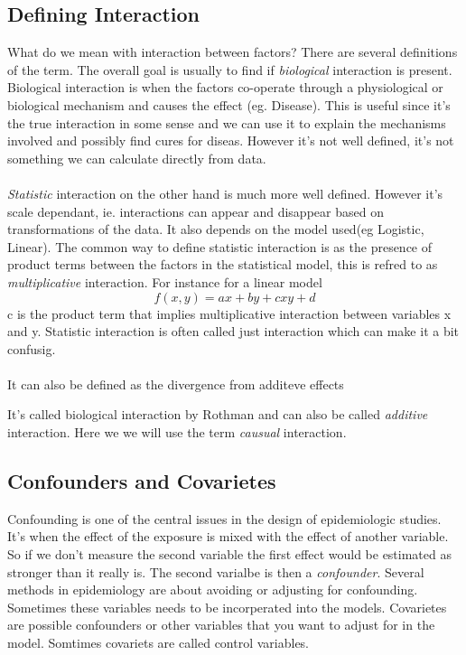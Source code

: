 \documentclass[10pt,a4paper]{article}
\begin{document}
\subsection{Defining Interaction}
What do we mean with interaction between factors? There are several definitions of the term\cite{rothman2002intro_epidemiology}. The overall goal is usually to find if \emph{biological} interaction is present. Biological interaction is when the factors co-operate through a physiological or biological mechanism and causes the effect (eg. Disease). This is useful since it's the true interaction in some sense and we can use it to explain the mechanisms involved and possibly find cures for diseas. However it's not well defined, it's not something we can calculate directly from data.\cite{rothman1998modern,rothman2002intro_epidemiology}\\
\\
\emph{Statistic} interaction on the other hand is much more well defined. However it's scale dependant, ie. interactions can appear and disappear based on transformations of the data. It also depends on the model used(eg Logistic, Linear). The common way to define statistic interaction is as the presence of product terms between the factors in the statistical model, this is refred to as \emph{multiplicative} interaction. For instance for a linear model
$$f(x,y)=ax+by+cxy+d$$
c is the product term that implies multiplicative interaction between variables x and y. Statistic interaction is often called just interaction which can make it a  bit confusig.\cite{geira,rothman1998modern}\\
\\
It can also be defined as the divergence from additeve effects

It's called biological interaction by Rothman\cite{} and can also be called \emph{additive} interaction\cite{geira}. Here we we will use the term \emph{causual} interaction.\\


\subsection{Confounders and Covarietes}
Confounding is one of the central issues in the design of epidemiologic studies. It's when the effect of the exposure is mixed with the effect of another variable. So if we don't measure the second variable the first effect would be estimated as stronger than it really is. The second varialbe is then a \emph{confounder}. Several methods in epidemiology are about avoiding or adjusting for confounding. Sometimes these variables needs to be incorperated into the models. Covarietes are possible confounders or other variables that you want to adjust for in the model. Somtimes covariets are called control variables.\cite{rothman2002intro_epidemiology,rothman1998modern}
\end{document}

